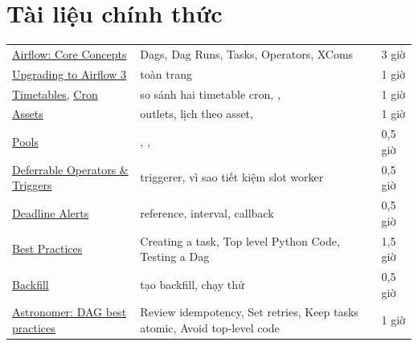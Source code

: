 \section{Tài liệu chính thức}
\begin{xltabular}{\textwidth}{@{}P{4.6cm} L P{1.8cm}@{}}
\toprule
{} &  &  \\
\midrule
\endhead
\bottomrule
\endfoot
\href{https://airflow.apache.org/docs/apache-airflow/stable/core-concepts/index.html}{Airflow: Core Concepts} & Dags, Dag Runs, Tasks, Operators, XComs & 3 giờ \\
\href{https://airflow.apache.org/docs/apache-airflow/stable/installation/upgrading_to_airflow3.html}{Upgrading to Airflow 3} & toàn trang & 1 giờ \\
\href{https://airflow.apache.org/docs/apache-airflow/stable/authoring-and-scheduling/timetable.html}{Timetables}, \href{https://airflow.apache.org/docs/apache-airflow/stable/authoring-and-scheduling/cron.html}{Cron} & so sánh hai timetable cron, ,  & 1 giờ \\
\href{https://airflow.apache.org/docs/apache-airflow/stable/authoring-and-scheduling/assets.html}{Assets} & outlets, lịch theo asset,  & 1 giờ \\
\href{https://airflow.apache.org/docs/apache-airflow/stable/administration-and-deployment/pools.html}{Pools} & , ,  & 0,5 giờ \\
\href{https://airflow.apache.org/docs/apache-airflow/stable/authoring-and-scheduling/deferring.html}{Deferrable Operators \& Triggers} & triggerer, vì sao tiết kiệm slot worker & 0,5 giờ \\
\href{https://airflow.apache.org/docs/apache-airflow/stable/howto/deadline-alerts.html}{Deadline Alerts} & reference, interval, callback & 0,5 giờ \\
\href{https://airflow.apache.org/docs/apache-airflow/stable/best-practices.html}{Best Practices} & Creating a task, Top level Python Code, Testing a Dag & 1,5 giờ \\
\href{https://airflow.apache.org/docs/apache-airflow/stable/core-concepts/backfill.html}{Backfill} & tạo backfill, chạy thử & 0,5 giờ \\
\href{https://www.astronomer.io/docs/airflow/dag-best-practices}{Astronomer: DAG best practices} & Review idempotency, Set retries, Keep tasks atomic, Avoid top-level code & 1 giờ \\
\end{xltabular}

